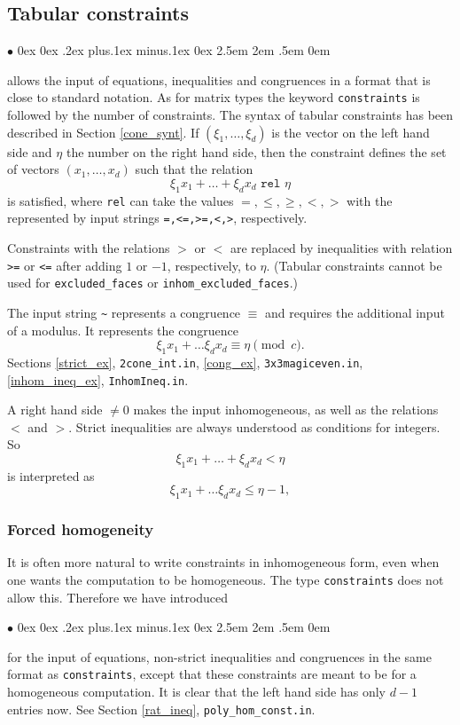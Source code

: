\documentclass[12pt,a4paper]{scrartcl}
\newcommand{\stdli}{ \topsep0ex \partopsep0ex %
\parsep.2ex plus.1ex minus.1ex \itemsep0ex%
\leftmargin2.5em \labelwidth2em \labelsep.5em \rightmargin0em}%
\renewenvironment{itemize}{\begin{list}{{$\bullet$}}{\stdli}}{\end{list}}
\theoremstyle{definition}
\def\itemtt[#1]{\item[\textbf{\ttt{#1}}]}
\def\ttt{\texttt}
\begin{document}
\subsection{Tabular constraints}

\begin{itemize}
	\itemtt[constraints] allows the input of equations, inequalities and congruences in a format that is close to standard notation. As for matrix types the keyword \verb|constraints| is followed by the number of constraints. The syntax of tabular constraints has been described in Section \ref{cone_synt}. If $(\xi_1,\dots,\xi_d)$ is the vector on the left hand side and $\eta$ the number on the right hand side, then the constraint defines the set of vectors $(x_1,\dots,x_d)$ such that the relation
	$$
	\xi_1x_1+\dots +\xi_dx_d \texttt{ rel } \eta
	$$
	is satisfied, where \verb|rel| can take the values $=,\leq,\geq,<,>$ with the represented by input strings \verb|=,<=,>=,<,>|, respectively.
	
	Constraints with the  relations $>$ or $<$ are replaced by inequalities with relation \verb|>=| or \verb|<=| after adding $1$ or $-1$, respectively, to $ \eta$. (Tabular constraints cannot be used for \verb|excluded_faces| or \verb|inhom_excluded_faces|.)
	
	The input string \verb|~| represents a congruence $\equiv$ and requires the additional input of a modulus. It represents the congruence
	$$
	\xi_1x_1+\dots \xi_dx_d \equiv \eta \pmod c. 
	$$
	Sections \ref{strict_ex}, \verb|2cone_int.in|,  \ref{cong_ex}, \ttt{3x3magiceven.in}, \ref{inhom_ineq_ex}, \verb|InhomIneq.in|.
\end{itemize}

A right hand side $\neq 0$ makes the input inhomogeneous, as well as the relations $<$ and $>$. Strict inequalities are always understood as conditions for integers. So
$$
\xi_1x_1+\dots +\xi_dx_d < \eta
$$
is interpreted as
$$
\xi_1x_1+\dots \xi_dx_d \le \eta-1,
$$


\subsubsection{Forced homogeneity}

It is often more natural to write constraints in inhomogeneous form, even when one wants the computation to be homogeneous. The type \verb|constraints| does not allow this. Therefore we have introduced
\begin{itemize}
	\itemtt[hom\_constraints] for the input of equations, non-strict inequalities and congruences in the same format as \verb|constraints|, except that these constraints are meant to be for a homogeneous computation. It is clear that the left hand side has only $d-1$ entries now. See Section \ref{rat_ineq}, \verb|poly_hom_const.in|.
\end{itemize}
\end{document}
